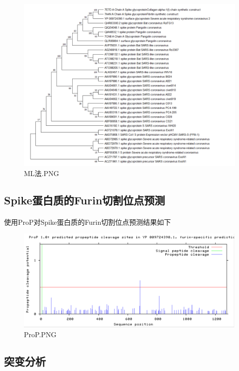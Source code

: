 \documentclass[supercite]{HustGraduPaper}
\begin{document}
	\begin{figure}[H]
		\centering
		\includegraphics[width=1\textwidth]{./material/practice4/ML.png}
		\caption{ML法.PNG}
	\end{figure}

	\subsection{Spike蛋白质的Furin切割位点预测}
	  \paragraph{}\label{subpara:subpara}使用ProP对Spike蛋白质的Furin切割位点预测结果如下
		\begin{figure}[H]
			\centering
			\includegraphics[width=1\textwidth]{./material/practice4/prop.png}
			\caption{ProP.PNG}
		\end{figure}
	\subsection{突变分析}
\end{document}
